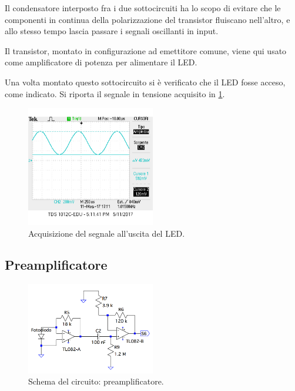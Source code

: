 \documentclass[a4paper,10pt]{article}
\begin{document}
Il condensatore interposto fra i due sottocircuiti ha lo scopo di evitare che le componenti in continua della polarizzazione del transistor fluiscano nell'altro, e allo stesso tempo lascia passare i segnali oscillanti in input.

Il transistor, montato in configurazione ad emettitore comune, viene qui usato come amplificatore di potenza per alimentare il LED.
\newline

Una volta montato questo sottocircuito si è verificato che il LED fosse acceso, come indicato.
Si riporta il segnale in tensione acquisito in \cref{fig:LED}.

\begin{figure}[H]
	\centering
	\includegraphics[width=0.5\textwidth]{../grafici/ledr4.png}
	\caption{Acquisizione del segnale all'uscita del LED.}
	\label{fig:LED}
\end{figure}



\subsection{Preamplificatore}

\begin{figure}
	\vspace{-10pt}
	\centering
	\includegraphics[width=0.5\textwidth]{../grafici/PreAmp.png}
	\vspace{-12pt}
	\caption{Schema del circuito: preamplificatore.}
	\label{fig:preamp}
	\vspace{-12pt}
\end{figure}
\end{document}
